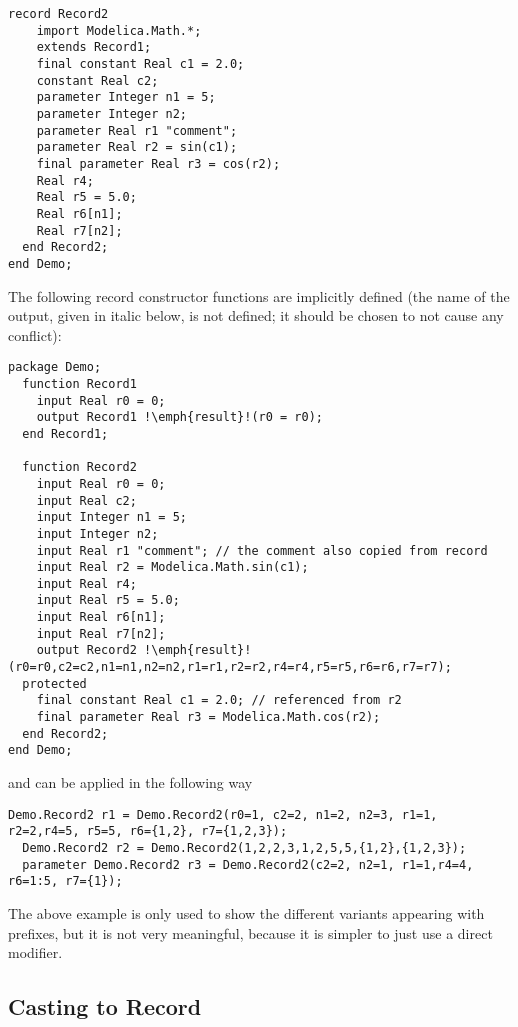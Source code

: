 \begin{nonnormative}
\begin{lstlisting}[language=modelica]
  record Record2
    import Modelica.Math.*;
    extends Record1;
    final constant Real c1 = 2.0;
    constant Real c2;
    parameter Integer n1 = 5;
    parameter Integer n2;
    parameter Real r1 "comment";
    parameter Real r2 = sin(c1);
    final parameter Real r3 = cos(r2);
    Real r4;
    Real r5 = 5.0;
    Real r6[n1];
    Real r7[n2];
  end Record2;
end Demo;
\end{lstlisting}

The following record constructor functions are implicitly defined
(the name of the output, given in italic below, is not defined; it
should be chosen to not cause any conflict):
\begin{lstlisting}[language=modelica,escapechar=!]
package Demo;
  function Record1
    input Real r0 = 0;
    output Record1 !\emph{result}!(r0 = r0);
  end Record1;

  function Record2
    input Real r0 = 0;
    input Real c2;
    input Integer n1 = 5;
    input Integer n2;
    input Real r1 "comment"; // the comment also copied from record
    input Real r2 = Modelica.Math.sin(c1);
    input Real r4;
    input Real r5 = 5.0;
    input Real r6[n1];
    input Real r7[n2];
    output Record2 !\emph{result}!(r0=r0,c2=c2,n1=n1,n2=n2,r1=r1,r2=r2,r4=r4,r5=r5,r6=r6,r7=r7);
  protected
    final constant Real c1 = 2.0; // referenced from r2
    final parameter Real r3 = Modelica.Math.cos(r2);
  end Record2;
end Demo;
\end{lstlisting}
and can be applied in the following way
\begin{lstlisting}[language=modelica]
  Demo.Record2 r1 = Demo.Record2(r0=1, c2=2, n1=2, n2=3, r1=1, r2=2,r4=5, r5=5, r6={1,2}, r7={1,2,3});
  Demo.Record2 r2 = Demo.Record2(1,2,2,3,1,2,5,5,{1,2},{1,2,3});
  parameter Demo.Record2 r3 = Demo.Record2(c2=2, n2=1, r1=1,r4=4, r6=1:5, r7={1});
\end{lstlisting}

The above example is only used to show the different variants
appearing with prefixes, but it is not very meaningful, because it is
simpler to just use a direct modifier.
\end{nonnormative}

\subsection{Casting to Record}

